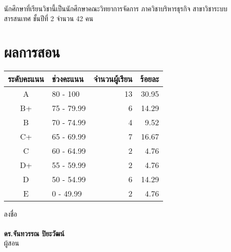 นักศึกษาที่เรียนวิชานี้เป็นนักศึกษาคณะวิทยาการจัดการ ภาควิชาบริหารธุรกิจ สาขาวิชาระบบสารสนเทศ ชั้นปีที่ 2 จำนวน 42 คน

\section*{ผลการสอน}

\begin{center}
\begin{tabu}{c l r r}
 \hline
 ระดับคะแนน & ช่วงคะแนน & จำนวนผู้เรียน & ร้อยละ \\ [0.5ex] 
 \hline
A & 80 - 100 & 13 & 30.95 \\
B+  & 75 - 79.99  & 6 & 14.29 \\
B  & 70 - 74.99  & 4 & 9.52 \\
C+ & 65 - 69.99 & 7 & 16.67 \\
C  & 60 - 64.99 & 2 & 4.76 \\
D+  & 55 - 59.99 & 2 & 4.76 \\
D  & 50 - 54.99 & 6 & 14.29 \\
E  & 0 - 49.99 & 2 & 4.76 \\
\hline
\end{tabu}
\end{center}


\vspace{7mm}
\noindent
\hangindent=9cm
ลงชื่อ\\
\vspace{10mm}\\
\textbf{ดร.จันทวรรณ ปิยะวัฒน์}\\
ผู้สอน



